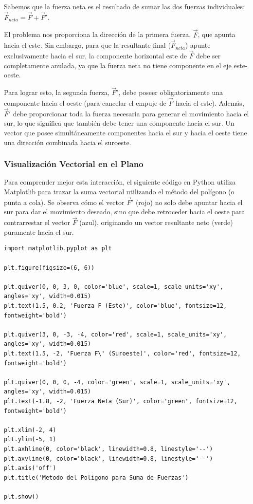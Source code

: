 \documentclass[12pt, a4paper]{article}
\begin{document}
Sabemos que la fuerza neta es el resultado de sumar las dos fuerzas individuales: $\vec{F}_{neta} = \vec{F} + \vec{F}'$. 

El problema nos proporciona la dirección de la primera fuerza, $\vec{F}$, que apunta hacia el este. Sin embargo, para que la resultante final ($\vec{F}_{neta}$) apunte exclusivamente hacia el sur, la componente horizontal este de $\vec{F}$ debe ser completamente anulada, ya que la fuerza neta no tiene componente en el eje este-oeste. 

Para lograr esto, la segunda fuerza, $\vec{F}'$, debe poseer obligatoriamente una componente hacia el oeste (para cancelar el empuje de $\vec{F}$ hacia el este). Además, $\vec{F}'$ debe proporcionar toda la fuerza necesaria para generar el movimiento hacia el sur, lo que significa que también debe tener una componente hacia el sur. Un vector que posee simultáneamente componentes hacia el sur y hacia el oeste tiene una dirección combinada hacia el suroeste.

\subsubsection*{Visualización Vectorial en el Plano}

Para comprender mejor esta interacción, el siguiente código en Python utiliza Matplotlib para trazar la suma vectorial utilizando el método del polígono (o punta a cola). Se observa cómo el vector $\vec{F}'$ (rojo) no solo debe apuntar hacia el sur para dar el movimiento deseado, sino que debe retroceder hacia el oeste para contrarrestar el vector $\vec{F}$ (azul), originando un vector resultante neto (verde) puramente hacia el sur.

\begin{lstlisting}
import matplotlib.pyplot as plt

plt.figure(figsize=(6, 6))

plt.quiver(0, 0, 3, 0, color='blue', scale=1, scale_units='xy', angles='xy', width=0.015)
plt.text(1.5, 0.2, 'Fuerza F (Este)', color='blue', fontsize=12, fontweight='bold')

plt.quiver(3, 0, -3, -4, color='red', scale=1, scale_units='xy', angles='xy', width=0.015)
plt.text(1.5, -2, 'Fuerza F\' (Suroeste)', color='red', fontsize=12, fontweight='bold')

plt.quiver(0, 0, 0, -4, color='green', scale=1, scale_units='xy', angles='xy', width=0.015)
plt.text(-1.8, -2, 'Fuerza Neta (Sur)', color='green', fontsize=12, fontweight='bold')

plt.xlim(-2, 4)
plt.ylim(-5, 1)
plt.axhline(0, color='black', linewidth=0.8, linestyle='--')
plt.axvline(0, color='black', linewidth=0.8, linestyle='--')
plt.axis('off')
plt.title('Metodo del Poligono para Suma de Fuerzas')

plt.show()
\end{lstlisting}
\end{document}
